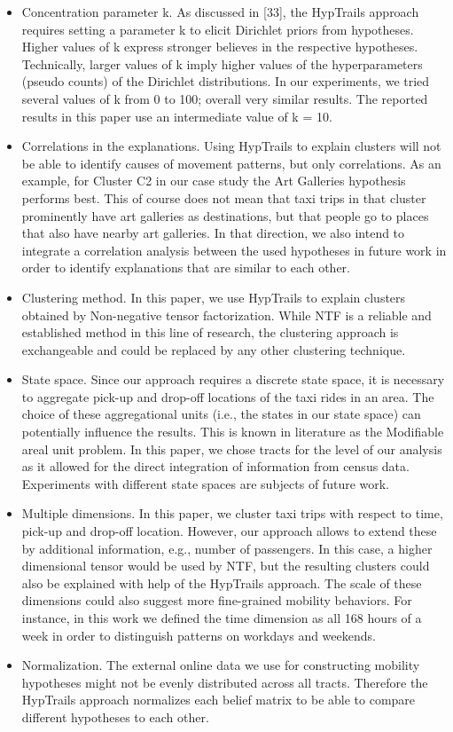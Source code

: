 \documentclass[a4paper, 10pt, conference]{ieeeconf}      %
\begin{document}
\begin{itemize}

\item Concentration parameter k. As discussed in [33], the HypTrails approach requires setting a parameter k to elicit Dirichlet priors from hypotheses. Higher values of k express stronger believes in the respective hypotheses. Technically, larger values of k imply higher values of the hyperparameters (pseudo counts) of the Dirichlet distributions. In our experiments, we tried several values of k from 0 to 100; overall very similar results. The reported results in this paper use an intermediate value of k = 10.
\item Correlations in the explanations. Using HypTrails to explain clusters will not be able to identify causes of movement patterns, but only correlations. As an example, for Cluster C2 in our case study the Art Galleries hypothesis performs best. This of course does not mean that taxi trips in that cluster prominently have art galleries as destinations, but that people go to places that also have nearby art galleries. In that direction, we also intend to integrate a correlation analysis between the used hypotheses in future work in order to identify explanations that are similar to each other.
\item Clustering method. In this paper, we use HypTrails to explain clusters obtained by Non-negative tensor factorization. While NTF is a reliable and established method in this line of research, the clustering approach is exchangeable and could be replaced by any other clustering technique.
\item State space. Since our approach requires a discrete state space, it is necessary to aggregate pick-up and drop-off locations of the taxi rides in an area. The choice of these aggregational units (i.e., the states in our state space) can potentially influence the results. This is known in literature as the Modifiable areal unit problem. In this paper, we chose tracts for the level of our analysis as it allowed for the direct integration of information from census data. Experiments with different state spaces are subjects of future work.
\item Multiple dimensions. In this paper, we cluster taxi trips with respect to time, pick-up and drop-off location. However, our approach allows to extend these by additional information, e.g., number of passengers. In this case, a higher dimensional tensor would be used by NTF, but the resulting clusters could also be explained with help of the HypTrails approach. The scale of these dimensions could also suggest more fine-grained mobility behaviors. For instance, in this work we defined the time dimension as all 168 hours of a week in order to distinguish patterns on workdays and weekends.
\item Normalization. The external online data we use for constructing mobility hypotheses might not be evenly distributed across all tracts. Therefore the HypTrails approach normalizes each belief matrix to be able to compare different hypotheses to each other.
\end{itemize}
\end{document}
